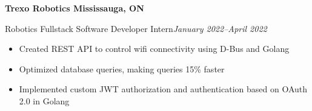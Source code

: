 \textbf{Trexo Robotics \hfill Mississauga, ON}

Robotics Fullstack Software Developer Intern\hfill \textit{January 2022--April 2022}
\begin{itemize}
    \item Created REST API to control wifi connectivity using D-Bus and Golang
    \item Optimized database queries, making queries 15\% faster
    \item Implemented custom JWT authorization and authentication based on OAuth 2.0 in Golang
\end{itemize}
